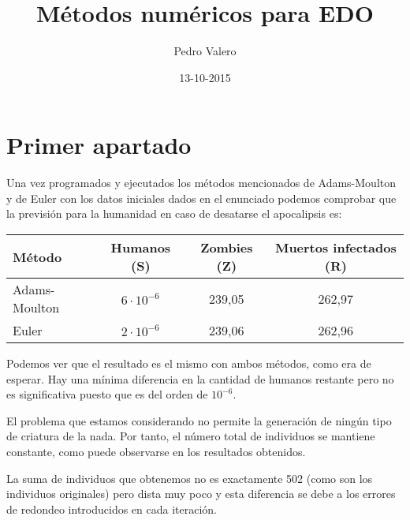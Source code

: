 \documentclass[nochap]{apuntes}
\title{Métodos numéricos para EDO}
\author{Pedro Valero}
\date{13-10-2015}
\begin{document}
\pagestyle{plain}

\section{Primer apartado}
Una vez programados y ejecutados los métodos mencionados de Adams-Moulton y de Euler con los datos iniciales dados en el enunciado podemos comprobar que la previsión para la humanidad en caso de desatarse el apocalipsis es:

\begin{center}
\begin{tabular}{lccc}    \toprule
Método    & Humanos (S)  & Zombies (Z)  & Muertos infectados (R)  \\ \midrule
Adams-Moulton & $6 \cdot 10^{-6}$ & 239,05 & 262,97\\
Euler & $2 \cdot 10^{-6}$ & 239,06 & 262,96\\\bottomrule
 \hline
\end{tabular}
\end{center}

Podemos ver que el resultado es el mismo con ambos métodos, como era de esperar. Hay una mínima diferencia en la cantidad de humanos restante pero no es significativa puesto que es del orden de $10^{-6}$.

El problema que estamos considerando no permite la generación de ningún tipo de criatura de la nada. Por tanto, el número total de individuos se mantiene constante, como puede observarse en los resultados obtenidos.

La suma de individuos que obtenemos no es exactamente 502 (como son los individuos originales) pero dista muy poco y esta diferencia se debe a los errores de redondeo introducidos en cada iteración.
\end{document}
